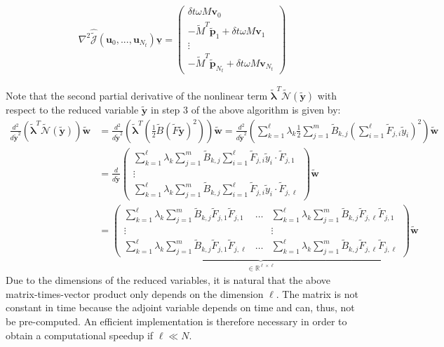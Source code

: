 \begin{algorithm}[H]
\begin{algorithmic}[1]
\begin{align}
\label{HessRedOrder}
\nabla^2 \hat{\tilde{\mathcal{J}}}(\mathbf{u}_0,...,\mathbf{u}_{N_t}) \mathbf{\underline{v}} = \begin{pmatrix} \delta \! t \omega M \mathbf{v}_0 \\ -\tilde{M}^T \mathbf{\tilde{p}}_1 + \delta \! t \omega M \mathbf{v}_1\\ \vdots \\ -\tilde{M}^T \mathbf{\tilde{p}}_{N_t} + \delta \! t \omega M \mathbf{v}_{N_t} \end{pmatrix}
\end{align}
\end{algorithmic}
\end{algorithm}
\newpage
Note that the second partial derivative of the nonlinear term $\tilde{\boldsymbol \lambda}^T \tilde{\mathcal{N}}(\mathbf{\tilde{y}})$ with respect to the reduced variable $\mathbf{\tilde{y}}$ in step $3$ of the above algorithm is given by:
\begin{align*}
\frac{d^2}{d\mathbf{\tilde y}^2} \left( \tilde{\boldsymbol \lambda}^T \tilde{\mathcal{N}}(\mathbf{\tilde{y}}) \right) \mathbf{\tilde{w}} &=  \frac{d^2}{d\mathbf{\tilde y}^2} \left( \boldsymbol{\tilde{\lambda}}^T (\frac{1}{2} \tilde{B} (\tilde{F} \mathbf{\tilde{y}})^2) \right) \mathbf{\tilde{w}}
=\frac{d^2}{d\mathbf{\tilde y}^2} \left( \sum_{k=1}^\ell \lambda_k \frac{1}{2} \sum_{j=1}^m \tilde{B}_{k,j} \left( \sum_{i=1}^\ell \tilde{F}_{j,i}\tilde{y}_i \right)^2 \right) \mathbf{\tilde{w}} \\
&= \frac{d}{d\mathbf{\tilde y}} \begin{pmatrix} \sum_{k=1}^\ell \lambda_k \sum_{j=1}^m \tilde{B}_{k,j} \sum_{i=1}^\ell \tilde{F}_{j,i}\tilde{y}_i \cdot \tilde{F}_{j,1}\\ \vdots \\ \sum_{k=1}^\ell \lambda_k \sum_{j=1}^m \tilde{B}_{k,j} \sum_{i=1}^\ell \tilde{F}_{j,i}\tilde{y}_i \cdot \tilde{F}_{j,\ell} \end{pmatrix}\mathbf{\tilde{w}} \\
&= \underbrace{\begin{pmatrix} \sum_{k=1}^\ell \lambda_k \sum_{j=1}^m \tilde{B}_{k,j} \tilde{F}_{j,1} \tilde{F}_{j,1} & \hdots & \sum_{k=1}^\ell \lambda_k \sum_{j=1}^m \tilde{B}_{k,j} \tilde{F}_{j,\ell} \tilde{F}_{j,1}\\ \vdots & & \vdots \\ \sum_{k=1}^\ell \lambda_k \sum_{j=1}^m \tilde{B}_{k,j} \tilde{F}_{j,1} \tilde{F}_{j,\ell} & \hdots & \sum_{k=1}^\ell \lambda_k \sum_{j=1}^m \tilde{B}_{k,j} \tilde{F}_{j,\ell} \tilde{F}_{j,\ell} \end{pmatrix}}_{\in \mathbb{R}^{\ell \times \ell}} \mathbf{\tilde{w}}
\end{align*}
Due to the dimensions of the reduced variables, it is natural that the above matrix-times-vector product only depends on the dimension $\ell$. The matrix is not constant in time because the adjoint variable depends on time and can, thus, not be pre-computed. An efficient implementation is therefore necessary in order to obtain a computational speedup if $\ell \ll N$.

